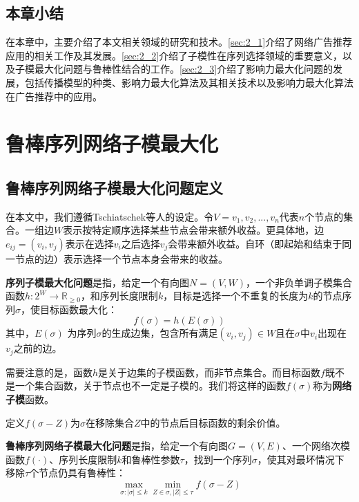 \section{本章小结}

在本章中，主要介绍了本文相关领域的研究和技术。\ref{sec:2_1}介绍了网络广告推荐应用的相关工作及其发展。\ref{sec:2_2}介绍了子模性在序列选择领域的重要意义，以及子模最大化问题与鲁棒性结合的工作。\ref{sec:2_3}介绍了影响力最大化问题的发展，包括传播模型的种类、影响力最大化算法及其相关技术以及影响力最大化算法在广告推荐中的应用。



\chapter{鲁棒序列网络子模最大化}

\section{鲁棒序列网络子模最大化问题定义}
\label{sec:3_1}
在本文中，我们遵循Tschiatschek等人\cite{tschiatschek2017selecting}的设定。令$V={v_1,v_2,...,v_n}$代表$n$个节点的集合。一组边\(W\)表示按特定顺序选择某些节点会带来额外收益。更具体地，边\(e_{ij} = (v_i,v_j)\)表示在选择\(v_i\)之后选择\(v_j\)会带来额外收益。自环（即起始和结束于同一节点的边）表示选择一个节点本身会带来的收益。

\begin{definition}
{\bfseries 序列子模最大化问题}是指，给定一个有向图\(N = (V,W)\)，一个非负单调子模集合函数\(h: 2^W \rightarrow \mathbb{R}_{\ge 0}\)，和序列长度限制\(k\)，目标是选择一个不重复的长度为\(k\)的节点序列\(\sigma\)，使目标函数最大化：
\begin{equation}
    f(\sigma)=h(E(\sigma))
\end{equation}
\noindent 其中，\(E(\sigma)\) 为序列$\sigma$的生成边集，包含所有满足\((v_i,v_j)\in W\)且在\(\sigma\)中\(v_i\)出现在\(v_j\)之前的边。
\end{definition}

需要注意的是，函数\(h\)是关于边集的子模函数，而非节点集合。而目标函数\(f\)既不是一个集合函数，关于节点也不一定是子模的。我们将这样的函数\(f(\sigma)\)称为{\bfseries 网络子模}函数。

定义\(f(\sigma - Z)\)为$\sigma$在移除集合\(Z\)中的节点后目标函数的剩余价值。
\begin{definition}
{\bfseries 鲁棒序列网络子模最大化问题}是指，给定一个有向图\(G=(V,E)\)、一个网络次模函数\(f(\cdot)\)、序列长度限制$k$和鲁棒性参数\(\tau\)，找到一个序列\(\sigma\)，使其对最坏情况下移除\(\tau\)个节点仍具有鲁棒性：
\begin{equation}
    \max_{\sigma:|\sigma|\le k} \min_{Z\in \sigma,|Z|\le \tau} f(\sigma - Z)
\end{equation}
\end{definition}

